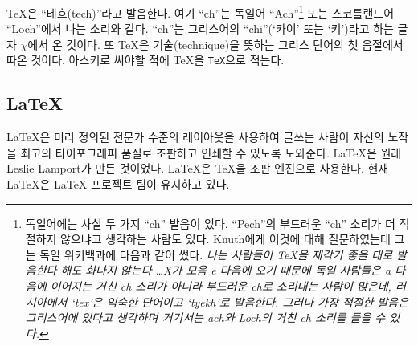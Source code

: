 \TeX 은 ``테흐(tech)''라고 발음한다.
여기 ``ch''는 독일어 ``Ach''\footnote{%
  독일어에는 사실 두 가지 ``ch'' 발음이 있다. ``Pech''의 부드러운 ``ch'' 소리가 더 적절하지
  않으냐고 생각하는 사람도 있다. Knuth에게 이것에 대해 질문하였는데 그는 독일 위키백과에 다음과 같이 썼다.
  \emph{나는 사람들이 \TeX 을 제각기 좋을 대로 발음한다 해도 화나지 않는다 \ldots X가 모음 e 다음에 오기
  때문에 독일 사람들은 a 다음에 이어지는 거친 ch 소리가 아니라 부드러운 ch로 소리내는 사람이 많은데,
  러시아에서 `tex'은 익숙한 단어이고 `tyekh'로 발음한다. 그러나 가장 적절한 발음은 그리스어에 있다고 생각하며
  거기서는 ach와 Loch의 거친 ch 소리를 들을 수 있다.}}
또는 스코틀랜드어 ``Loch''에서
나는 소리와 같다. ``ch''는 그리스어의 ``chi''(`카이' 또는 `키')라고 하는 글자 $\chi$에서 온 것이다.
또 \TeX 은 기술(technique)을 뜻하는 그리스 단어의 첫 음절에서 따온 것이다.
아스키로 써야할 적에 \TeX 을 \texttt{TeX}으로 적는다.

\subsection{\LaTeX}

\LaTeX 은 미리 정의된 전문가 수준의 레이아웃을 사용하여 글쓰는 사람이 자신의 노작을 
최고의 타이포그래피 품질로 조판하고 인쇄할 수 있도록 도와준다.
\LaTeX 은 원래 Leslie Lamport가 만든 것이었다\cite{manual}.
\LaTeX 은 \TeX 을 조판 엔진으로 사용한다. 현재 \LaTeX 은 \LaTeX{} 프로젝트 팀이
유지하고 있다.


